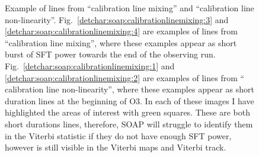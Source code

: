 \begin{figure}[hpt]
\begin{subfigure}[h]{0.49\textwidth}
\end{subfigure}
	\caption[Example of lines from ``calibration line mixing'' and ``calibration line non-linearity''.]{Example of lines from ``calibration line mixing'' and ``calibration line non-linearity''. Fig.~\ref{detchar:soap:calibrationlinemixing:3} and \ref{detchar:soap:calibrationlinemixing:4}  are examples of lines from ``calibration line mixing'', where these examples appear as short burst of \gls{SFT} power towards the end of the observing run. Fig.~\ref{detchar:soap:calibrationlinemixing:1} and \ref{detchar:soap:calibrationlinemixing:2} are examples of lines from `` calibration line non-linearity'', where these examples appear as short duration lines at the beginning of O3.  In each of these images I have highlighted the areas of interest with green squares. These are both short durations lines, therefore, SOAP will struggle to identify them in the Viterbi statistic if they do not have enough \gls{SFT} power, however is still visible in the Viterbi maps and Viterbi track.}
	\label{detchar:soap:calibrationlinemixing}
\end{figure}
%

